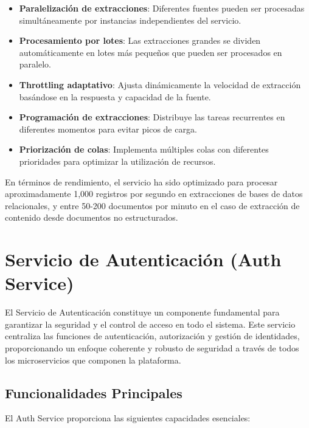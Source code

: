 \documentclass[12pt,a4paper]{article}
\begin{document}
\begin{itemize}
    \item \textbf{Paralelización de extracciones}: Diferentes fuentes pueden ser procesadas simultáneamente por instancias independientes del servicio.
    
    \item \textbf{Procesamiento por lotes}: Las extracciones grandes se dividen automáticamente en lotes más pequeños que pueden ser procesados en paralelo.
    
    \item \textbf{Throttling adaptativo}: Ajusta dinámicamente la velocidad de extracción basándose en la respuesta y capacidad de la fuente.
    
    \item \textbf{Programación de extracciones}: Distribuye las tareas recurrentes en diferentes momentos para evitar picos de carga.
    
    \item \textbf{Priorización de colas}: Implementa múltiples colas con diferentes prioridades para optimizar la utilización de recursos.
\end{itemize}

En términos de rendimiento, el servicio ha sido optimizado para procesar aproximadamente 1,000 registros por segundo en extracciones de bases de datos relacionales, y entre 50-200 documentos por minuto en el caso de extracción de contenido desde documentos no estructurados.

\section{Servicio de Autenticación (Auth Service)}
\label{sec:auth-service}

El Servicio de Autenticación constituye un componente fundamental para garantizar la seguridad y el control de acceso en todo el sistema. Este servicio centraliza las funciones de autenticación, autorización y gestión de identidades, proporcionando un enfoque coherente y robusto de seguridad a través de todos los microservicios que componen la plataforma.

\subsection{Funcionalidades Principales}
\label{subsec:as-funcionalidades}

El Auth Service proporciona las siguientes capacidades esenciales:
\end{document}
